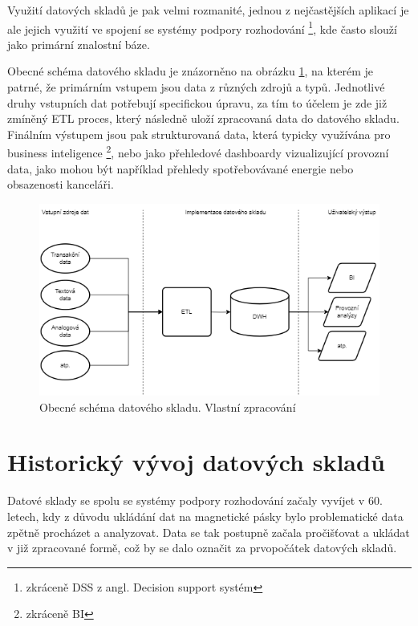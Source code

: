 \documentclass[
  digital,     %
  twoside,     %
  lof,         %
  lot,         %
]{fithesis4}
\begin{document}
Využití datových skladů je pak velmi rozmanité, jednou z nejčastějších aplikací je ale jejich využití ve spojení se systémy podpory rozhodování \footnote{zkráceně DSS z angl. Decision support
systém}, kde často slouží jako primární znalostní báze. \parencite[s.~2]{Inmon2005}

Obecné schéma datového skladu je znázorněno na obrázku \ref{fig:dwh_schema}, na kterém je patrné, že primárním vstupem jsou data z různých zdrojů a typů. Jednotlivé druhy vstupních dat potřebují specifickou úpravu, za tím to účelem je zde již zmíněný ETL proces, který následně uloží zpracovaná data do datového skladu. Finálním výstupem jsou pak strukturovaná data, která typicky využívána pro business inteligence \footnote{zkráceně BI}, nebo jako přehledové dashboardy vizualizující provozní data, jako mohou být například přehledy spotřebovávané energie nebo obsazenosti kanceláři.

\begin{figure}[h]
  \begin{center}
          \includegraphics[width=12cm]{img/dwh_schma.png}
  \end{center}
  \caption{Obecné schéma datového skladu. Vlastní zpracování}
  \label{fig:dwh_schema}
\end{figure}  



\section{Historický vývoj datových skladů}
Datové sklady se spolu se systémy podpory rozhodování začaly vyvíjet v 60. letech, kdy z důvodu ukládání dat na magnetické pásky bylo problematické data zpětně procházet a analyzovat. Data se tak postupně začala pročišťovat a ukládat v již zpracované formě, což by se dalo označit za prvopočátek datových skladů.\parencite[s.~2]{Inmon2005}
\end{document}
